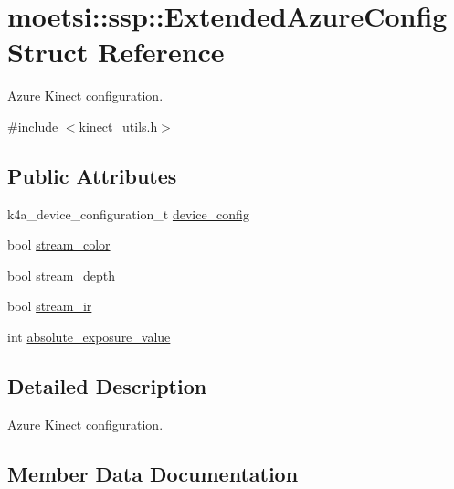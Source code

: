 \hypertarget{structmoetsi_1_1ssp_1_1ExtendedAzureConfig}{}\section{moetsi\+:\+:ssp\+:\+:Extended\+Azure\+Config Struct Reference}
\label{structmoetsi_1_1ssp_1_1ExtendedAzureConfig}


Azure Kinect configuration.  




{\ttfamily \#include $<$kinect\+\_\+utils.\+h$>$}

\subsection*{Public Attributes}
\begin{DoxyCompactItemize}
\item 
k4a\+\_\+device\+\_\+configuration\+\_\+t \hyperlink{structmoetsi_1_1ssp_1_1ExtendedAzureConfig_a59803eec12939eece3811e3e5d2169e8}{device\+\_\+config}
\item 
bool \hyperlink{structmoetsi_1_1ssp_1_1ExtendedAzureConfig_a602b49142877ef3f88972153cb1478d1}{stream\+\_\+color}
\item 
bool \hyperlink{structmoetsi_1_1ssp_1_1ExtendedAzureConfig_ae189c45e7f654e635d802713814cda3e}{stream\+\_\+depth}
\item 
bool \hyperlink{structmoetsi_1_1ssp_1_1ExtendedAzureConfig_ab4c4fd8a25fe1a5c97aace78bc6d987c}{stream\+\_\+ir}
\item 
int \hyperlink{structmoetsi_1_1ssp_1_1ExtendedAzureConfig_acc60c61ea4d7717f1982f177c56662ea}{absolute\+\_\+exposure\+\_\+value}
\end{DoxyCompactItemize}


\subsection{Detailed Description}
Azure Kinect configuration. 

\subsection{Member Data Documentation}
\mbox{\label{structmoetsi_1_1ssp_1_1ExtendedAzureConfig_acc60c61ea4d7717f1982f177c56662ea}} 
